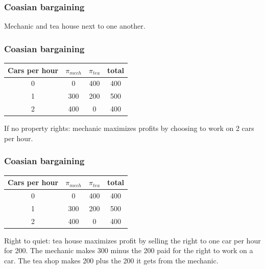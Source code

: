 \documentclass[xcolor=pdftex,dvipsnames]{beamer}
\begin{document}
\begin{frame}
  \frametitle{Coasian bargaining}
  Mechanic and tea house next to one another.\bigskip

\bigskip
\begin{center}
  
\end{center}


\end{frame}

\begin{frame}
  \frametitle{Coasian bargaining}
\begin{center}
  
\begin{tabular}{|c|ccc|}
\hline  Cars per hour & $\pi_{mech}$ & $\pi_{tea}$ & total\\
\hline 0 & 0 & 400 & 400\\
\hline 1 & 300 & 200 & 500\\
\hline {\color{red} 2} &{\color{red} 400} & {\color{red} 0} & {\color{red} 400}\\
\hline
\end{tabular}
\end{center}
If no property rights: mechanic maximizes profits by choosing to work
on 2 cars per hour.
\end{frame}

\begin{frame}
\frametitle{Coasian bargaining}
\begin{center}
\begin{tabular}{|c|ccc|}
\hline  Cars per hour & $\pi_{mech}$ & $\pi_{tea}$ & total\\
\hline 0 & 0 & 400 & 400\\
\hline {\color{red} 1} &{\color{red} 300} & {\color{red} 200} & {\color{red} 500}\\
\hline 2 & 400&0 & 400\\
\hline
\end{tabular}
\end{center}
Right to quiet:
tea house  maximizes profit by selling the
right to one car per hour for 200. The mechanic makes 300 minus the
200 paid for the right to work on a car. The tea shop makes 200 plus
the 200 it gets from the mechanic.


\end{frame}
\end{document}
